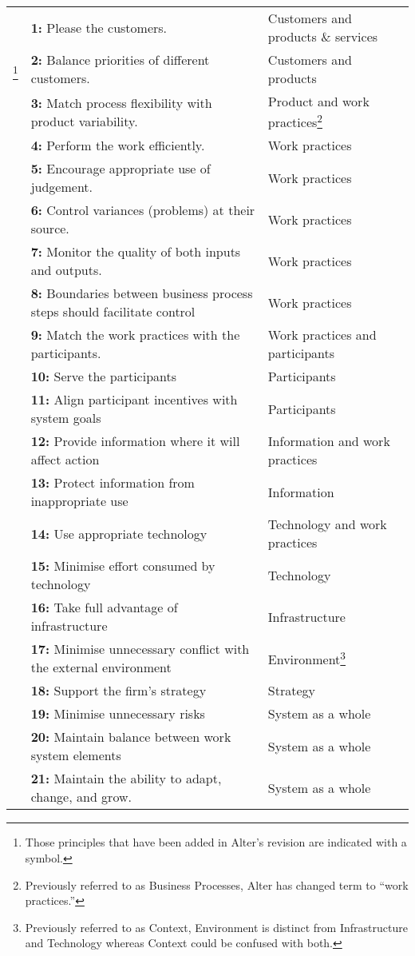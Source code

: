 \begin{longtable}[t]{c p{6cm} l}
& \textbf{1:} Please the customers. & Customers and products \& services \\
\dag{}\footnote{Those principles that have been added in Alter's revision are indicated with a \dag{} symbol.} & \textbf{2:} Balance priorities of different customers. & Customers and products \\
\dag{} & \textbf{3:} Match process flexibility with product variability. & Product and work practices\footnote{Previously referred to as Business Processes, Alter has changed term to ``work practices.''} \\
& \textbf{4:} Perform the work efficiently. & Work practices \\
\dag{} & \textbf{5:} Encourage appropriate use of judgement. & Work practices \\
\dag{} & \textbf{6:} Control variances (problems) at their source. & Work practices \\
\dag{} & \textbf{7:} Monitor the quality of both inputs and outputs. & Work practices \\
\dag{} & \textbf{8:} Boundaries between business process steps should facilitate control & Work practices \\
\dag{} & \textbf{9:} Match the work practices with the participants. & Work practices and participants \\
& \textbf{10:} Serve the participants & Participants \\
\dag{} & \textbf{11:} Align participant incentives with system goals & Participants \\
\dag{} & \textbf{12:} Provide information where it will affect action & Information and work practices \\
\dag{} & \textbf{13:} Protect information from inappropriate use & Information \\
\dag{} & \textbf{14:} Use appropriate technology & Technology and work practices \\
& \textbf{15:} Minimise effort consumed by technology & Technology \\
& \textbf{16:} Take full advantage of infrastructure & Infrastructure \\
& \textbf{17:} Minimise unnecessary conflict with the external environment & Environment\footnote{Previously referred to as Context, Environment is distinct from Infrastructure and Technology whereas Context could be confused with both.} \\
& \textbf{18:} Support the firm's strategy & Strategy \\
& \textbf{19:} Minimise unnecessary risks & System as a whole \\
& \textbf{20:} Maintain balance between work system elements & System as a whole \\
\dag{} & \textbf{21:} Maintain the ability to adapt, change, and grow. & System as a whole \\
\end{longtable}
\doublespacing

